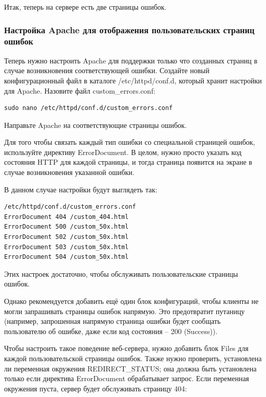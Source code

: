 \documentclass[14pt, a4paper]{article}
\begin{document}
Итак, теперь на сервере есть две страницы ошибок.

\subsubsection*{Настройка Apache для отображения пользовательских страниц ошибок}

Теперь нужно настроить Apache для поддержки только что созданных страниц в случае возникновения 
соответствующей ошибки. Создайте новый конфигурационный файл в каталоге /etc/httpd/conf.d, который 
хранит настройки для Apache. Назовите файл custom\_errors.conf:

\begin{lstlisting}
sudo nano /etc/httpd/conf.d/custom_errors.conf
\end{lstlisting}
Направьте Apache на соответствующие страницы ошибок.

Для того чтобы связать каждый тип ошибки со специальной страницей ошибок, используйте директиву ErrorDocument. 
В целом, нужно просто указать код состояния HTTP для каждой страницы, и тогда страница появится на экране в 
случае возникновения указанной ошибки.

В данном случае настройки будут выглядеть так:

\begin{lstlisting}
/etc/httpd/conf.d/custom_errors.conf
ErrorDocument 404 /custom_404.html
ErrorDocument 500 /custom_50x.html
ErrorDocument 502 /custom_50x.html
ErrorDocument 503 /custom_50x.html
ErrorDocument 504 /custom_50x.html
\end{lstlisting}

Этих настроек достаточно, чтобы обслуживать пользовательские страницы ошибок.

Однако рекомендуется добавить ещё один блок конфигураций, чтобы клиенты не могли запрашивать 
страницы ошибок напрямую. Это предотвратит путаницу (например, запрошенная напрямую страница ошибки 
будет сообщать пользователю об ошибке, даже если код состояния – 200 (Success)).

Чтобы настроить такое поведение веб-сервера, нужно добавить блок Files для каждой пользовательской 
страницы ошибок. Также нужно проверить, установлена ли переменная окружения REDIRECT\_STATUS; она должна быть 
установлена только если директива ErrorDocument обрабатывает запрос. Если переменная окружения пуста, сервер 
будет обслуживать страницу 404:
\end{document}
